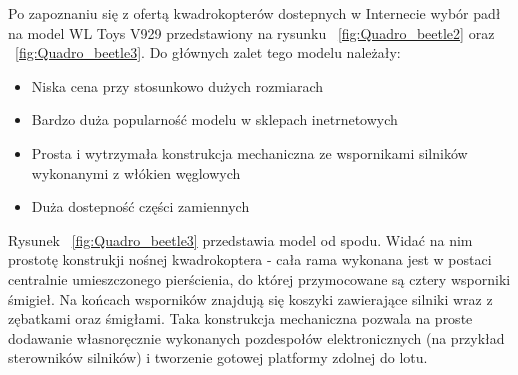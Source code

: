 Po zapoznaniu się z ofertą kwadrokopterów dostepnych w Internecie wybór padł na model WL Toys V929 przedstawiony na rysunku ~\ref{fig:Quadro_beetle2} oraz ~\ref{fig:Quadro_beetle3}. Do głównych zalet tego modelu należały:

\begin{itemize}
	\item Niska cena przy stosunkowo dużych rozmiarach
	\item Bardzo duża popularność modelu w sklepach inetrnetowych
	\item Prosta i wytrzymała konstrukcja mechaniczna ze wspornikami silników wykonanymi z włókien węglowych
	\item Duża dostepność części zamiennych
\end{itemize}



Rysunek ~\ref{fig:Quadro_beetle3} przedstawia model od spodu. Widać na nim prostotę konstrukji nośnej kwadrokoptera - cała rama wykonana jest w postaci centralnie umieszczonego pierścienia, do której przymocowane są cztery wsporniki śmigieł. Na końcach wsporników znajdują się koszyki zawierające silniki wraz z zębatkami oraz śmigłami. Taka konstrukcja mechaniczna pozwala na proste dodawanie własnoręcznie wykonanych pozdespołów elektronicznych (na przykład sterowników silników) i tworzenie gotowej platformy zdolnej do lotu. 

